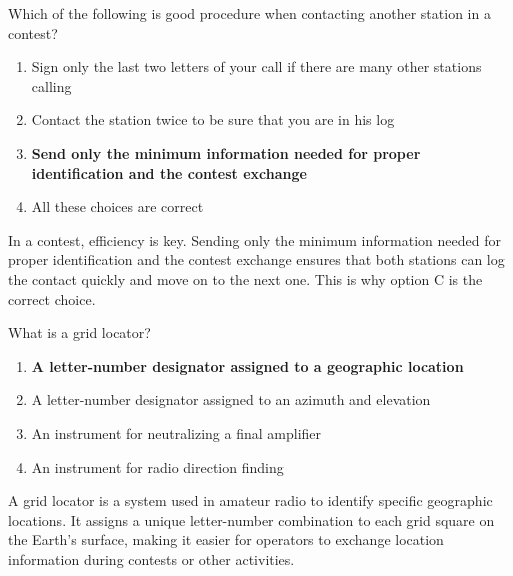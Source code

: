 \begin{tcolorbox}[colback=gray!10!white,colframe=black!75!black,title={T8C04}]
    Which of the following is good procedure when contacting another station in a contest?
    \begin{enumerate}[label=\Alph*),noitemsep]
        \item Sign only the last two letters of your call if there are many other stations calling
        \item Contact the station twice to be sure that you are in his log
        \item \textbf{Send only the minimum information needed for proper identification and the contest exchange}
        \item All these choices are correct
    \end{enumerate}
\end{tcolorbox}
In a contest, efficiency is key. Sending only the minimum information needed for proper identification and the contest exchange ensures that both stations can log the contact quickly and move on to the next one. This is why option C is the correct choice.

\begin{tcolorbox}[colback=gray!10!white,colframe=black!75!black,title={T8C05}]
    What is a grid locator?
    \begin{enumerate}[label=\Alph*),noitemsep]
        \item \textbf{A letter-number designator assigned to a geographic location}
        \item A letter-number designator assigned to an azimuth and elevation
        \item An instrument for neutralizing a final amplifier
        \item An instrument for radio direction finding
    \end{enumerate}
\end{tcolorbox}
A grid locator is a system used in amateur radio to identify specific geographic locations. It assigns a unique letter-number combination to each grid square on the Earth's surface, making it easier for operators to exchange location information during contests or other activities.
